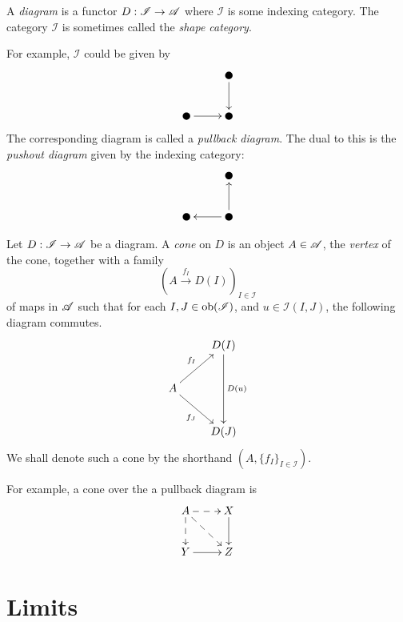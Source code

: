 \begin{definition}[Diagram]
    A \textit{diagram} is a functor $D:\mathscr I\to\mathscr{A}$ where $\mathscr I$ is some indexing category. The category $\mathscr I$ is sometimes called the \textit{shape category}.
\end{definition}

For example, $\mathscr I$ could be given by 
\begin{equation*}
    \xymatrix{
        &\newmoon\ar[d]\\
        \newmoon\ar[r] & \newmoon
    }
\end{equation*}
The corresponding diagram is called a \textit{pullback diagram}. The dual to this is the \textit{pushout diagram} given by the indexing category: 
\begin{equation*}
    \xymatrix {
        &\newmoon\\
        \newmoon & \newmoon\ar[l]\ar[u]
    }
\end{equation*}

\begin{definition}[Cone]
    Let $D:\mathscr I\to\mathscr{A}$ be a diagram. A \textit{cone} on $D$ is an object $A\in\mathscr{A}$, the \textit{vertex} of the cone, together with a family 
    \begin{equation*}
        \left(A\stackrel{f_I}{\longrightarrow}D(I)\right)_{I\in\mathscr I}
    \end{equation*}
    of maps in $\mathscr{A}$ such that for each $I, J\in\operatorname{ob}(\mathscr I)$, and $u\in\mathscr I(I,J)$, the following diagram commutes.
    \begin{equation*}
        \xymatrix{
            & D(I)\ar[dd]^{D(u)}\\
            A\ar[ru]^{f_I}\ar[rd]_{f_J}\\
            & D(J)
        }
    \end{equation*}
    We shall denote such a cone by the shorthand $(A, \{f_I\}_{I\in\mathscr I})$.
\end{definition}

For example, a cone over the a pullback diagram is 
\begin{equation*}
    \xymatrix{
        A\ar@{-->}[r]\ar@{-->}[rd]\ar@{-->}[d] & X\ar[d]\\
        Y\ar[r] & Z
    }
\end{equation*}

\section{Limits}

